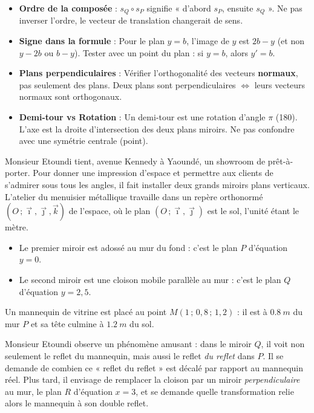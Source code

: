 \documentclass[11pt]{article}
\newcounter{popsec}
\newcounter{popsub}
\newcommand{\courssub}[1]{%
  \stepcounter{popsub}%
  \par\vspace{9pt}\noindent{\popxbold\fontsize{11.5}{13}\selectfont\color{popink}{\color{poporange}\thepopsec.\thepopsub}\hspace{6pt}#1}\par\nopagebreak\vspace{4pt}
}
\begin{document}
\begin{attention}
\begin{itemize}
\item \textbf{Ordre de la composée} : $s_Q \circ s_P$ signifie « d'abord $s_P$, ensuite $s_Q$ ». Ne pas inverser l'ordre, le vecteur de translation changerait de sens.
\item \textbf{Signe dans la formule} : Pour le plan $y = b$, l'image de $y$ est $2b - y$ (et non $y - 2b$ ou $b - y$). Tester avec un point du plan : si $y=b$, alors $y'=b$.
\item \textbf{Plans perpendiculaires} : Vérifier l'orthogonalité des vecteurs \textbf{normaux}, pas seulement des plans. Deux plans sont perpendiculaires $\iff$ leurs vecteurs normaux sont orthogonaux.
\item \textbf{Demi-tour vs Rotation} : Un demi-tour est une rotation d'angle $\pi$ (180\textdegree). L'axe est la droite d'intersection des deux plans miroirs. Ne pas confondre avec une symétrie centrale (point).
\end{itemize}
\end{attention}

\courssub{Situation}

Monsieur Etoundi tient, avenue Kennedy à Yaoundé, un showroom de prêt-à-porter. Pour donner une impression d'espace et permettre aux clients de s'admirer sous tous les angles, il fait installer deux grands miroirs plans verticaux. L'atelier du menuisier métallique travaille dans un repère orthonormé $(O\,;\vec{\imath},\vec{\jmath},\vec{k})$ de l'espace, où le plan $(O\,;\vec{\imath},\vec{\jmath})$ est le sol, l'unité étant le mètre.

\begin{itemize}
\item Le premier miroir est adossé au mur du fond : c'est le plan $P$ d'équation $y = 0$.
\item Le second miroir est une cloison mobile parallèle au mur : c'est le plan $Q$ d'équation $y = 2{,}5$.
\end{itemize}

Un mannequin de vitrine est placé au point $M(1\,;\,0{,}8\,;\,1{,}2)$ : il est à $\SI{0,8}{m}$ du mur $P$ et sa tête culmine à $\SI{1,2}{m}$ du sol.

Monsieur Etoundi observe un phénomène amusant : dans le miroir $Q$, il voit non seulement le reflet du mannequin, mais aussi le reflet \emph{du reflet} dans $P$. Il se demande de combien ce « reflet du reflet » est décalé par rapport au mannequin réel. Plus tard, il envisage de remplacer la cloison par un miroir \emph{perpendiculaire} au mur, le plan $R$ d'équation $x = 3$, et se demande quelle transformation relie alors le mannequin à son double reflet.
\end{document}
